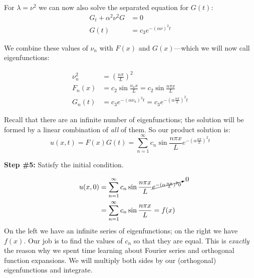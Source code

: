 For $\lambda = \nu^2$ we can now also solve the separated equation for $G(t)$:
\begin{align*}
G_t + \alpha^2 \nu^2 G &= 0 \\
G(t) &= c_3 e^{-(\alpha \nu)^2 t}
\end{align*}

\noindent We combine these values of $\nu_n$ with $F(x)$ and $G(x)$---which we will now call eigenfunctions: 

\begin{align*}
\nu^2_n &= \left(\frac{n \pi}{L} \right)^2 \\
F_n(x) &= c_2\sin{\frac{\nu_n x}{L}} = c_2\sin{\frac{n \pi x}{L}} \\
G_n(t) &= c_3e^{-(\alpha \nu_n)^2 t} = c_3 e^{-(\alpha \frac{n \pi}{L})^2 t}
\end{align*}

\noindent Recall that there are an infinite number of eigenfunctions; the solution will be formed by a linear combination of \emph{all} of them.  So our product solution is:
\begin{equation*}
u(x,t) = F(x)G(t) = \sum\limits_{n=1}^{\infty} c_n \sin{\frac{n \pi x}{L}} e^{-(\alpha \frac{n \pi}{L})^2 t}
\end{equation*}

\vspace{0.5cm}

\noindent\textbf{Step \#5:} Satisfy the initial condition.

\begin{align*}
u(x,0) &= \sum\limits_{n=1}^{\infty}c_n \sin{\frac{n \pi x}{L}} \cancelto{0}{e^{-(\alpha \frac{n \pi}{L})^2 0}} \\
&= \sum\limits_{n=1}^{\infty}c_n \sin{\frac{n \pi x}{L}} = f(x)
\end{align*}
On the left we have an infinite series of eigenfunctions; on the right we have $f(x)$.  Our job is to find the values of $c_n$ so that they are equal.  This is \emph{exactly} the reason why we spent time learning about Fourier series and orthogonal function expansions.  We will multiply both sides by our (orthogonal) eigenfunctions and integrate.

